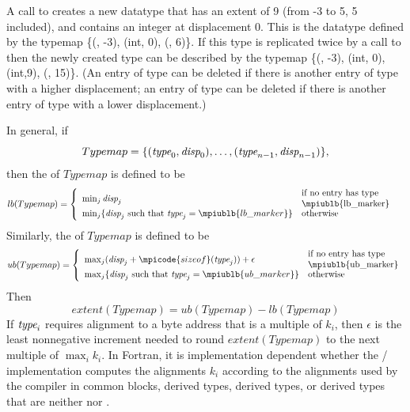 \begin{example}
\label{pt2pt-exX}
%
A call to
creates a new datatype that has an
extent of 9 (from -3 to 5, 5 included), and contains an integer at
displacement 0.   This is the datatype defined by the typemap
\{(, -3), (int, 0), (, 6)\}.
If this type is replicated twice by a call to
 then the newly created
type can
be described by the typemap
\{(, -3), (int, 0), (int,9), (, 15)\}.
(An entry of type
can be deleted if there is another entry of type  with a
higher
displacement; an entry of type  can be deleted if there
is another
entry of type  with a lower displacement.)
\end{example}

In general, if
\begin{displaymath}
Typemap = \{ (\textrm{\itshape{type}}_0 , \textrm{\itshape{disp}}_0 ) , \ldots , (\textrm{\itshape{type}}_{n-1} , \textrm{\itshape{disp}}_{n-1}) \} ,
\end{displaymath}
then the  of $Typemap$ is defined to be
\[
lb(Typemap) = \left\{ \begin{array}{ll}
\min_j \mword{disp}_j & \parbox{1.5in}{\raggedright if no entry has type
\mpiublb{lb\_marker}} \\
\min_j \{ \mword{disp}_j \ \mbox{such that}\ \mword{type}_j = \mpiublb{lb\_marker} \} & \mbox{otherwise}
\end{array}
\right. \]
Similarly,
the  of $Typemap$ is defined to be
\[
ub(Typemap) = \left\{ \begin{array}{ll}
\max_j(\mword{disp}_j + \mpicode{sizeof}(\mword{type}_j)) + \epsilon & \parbox{1.4in}{\raggedright if no entry has type
\mpiublb{ub\_marker}}
\\ \max_j \{ \mword{disp}_j \ \mbox{such that}\ \mword{type}_j = \mpiublb{ub\_marker} \} & \mbox{otherwise}
\end{array}
\right. \]
Then
\[
extent(Typemap) = ub(Typemap) - lb(Typemap)
\]
If $\textrm{\itshape{type}}_i$ requires alignment to a byte address that is a multiple of $k_i$,
then $\epsilon$ is the least nonnegative increment needed to round
$extent(Typemap)$ to the next multiple of $\max_i k_i$.
In Fortran, it is implementation dependent whether the \MPI/ implementation computes the alignments $k_i$ according to the alignments
used by the compiler in common blocks,  derived types,  derived types,
or derived types that are neither  nor .


